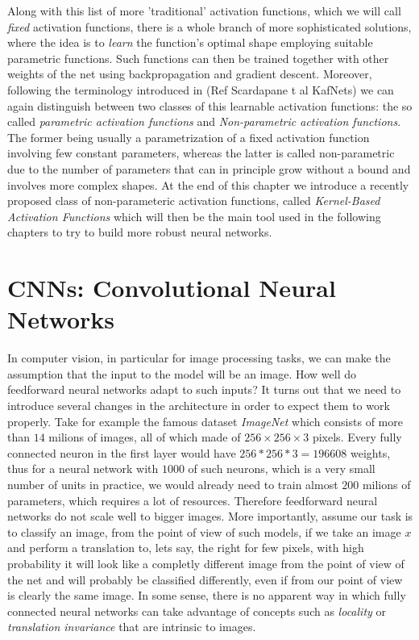 \documentclass[LaM,binding=0.6cm]{./packages/sapthesis/sapthesis}
\begin{document}
            Along with this list of more 'traditional' activation functions, which we will call \textit{fixed} activation functions, there is a whole branch of
            more sophisticated solutions, where the idea is to \textit{learn} the function's optimal shape employing suitable parametric functions. 
            Such functions can then be trained together with other weights of the net using backpropagation and gradient descent. Moreover, following the terminology
            introduced in (Ref Scardapane t al KafNets) we can again distinguish between two classes of this learnable activation functions: the so called
            \textit{parametric activation functions} and \textit{Non-parametric activation functions}. The former being usually a parametrization of a fixed 
            activation function involving few constant parameters, whereas the latter is called non-parametric due to the number of parameters that can in principle
            grow without a bound and involves more complex shapes. At the end of this chapter we introduce a recently proposed class of non-parameteric activation functions,
            called \textit{Kernel-Based Activation Functions} which will then be the main tool used in the following chapters to try to build more robust neural networks.    


        \section{CNNs: Convolutional Neural Networks}

            In computer vision, in particular for image processing tasks, we can make the assumption that the input to the model will be an image. 
            How well do feedforward neural networks adapt to such inputs? It turns out that we need to introduce several changes in the architecture in order to expect 
            them to work properly. Take for example the famous dataset \textit{ImageNet} which consists of more than $ 14 $ milions of images,
            all of which made of $ 256 \times 256 \times 3 $ pixels. Every fully connected neuron in the first layer would have $ 256 * 256 * 3 =  196608 $ weights,
            thus for a neural network with $ 1000 $ of such neurons, which is a very small number of units in practice, we would already need to train almost $ 200 $ milions of parameters,
            which requires a lot of resources. Therefore feedforward neural networks do not scale well to bigger images. More importantly, assume our task is to 
            classify an image, from the point of view of such models, if we take an image $x$ and perform a translation to, lets say, the right for few pixels, with high 
            probability it will look like a completly different image from the point of view of the net and will probably be classified differently, even if 
            from our point of view is clearly the same image. In some sense, there is no apparent way in which fully connected neural networks can take advantage of 
            concepts such as \textit{locality} or \textit{translation invariance} that are intrinsic to images.
            
\end{document}
